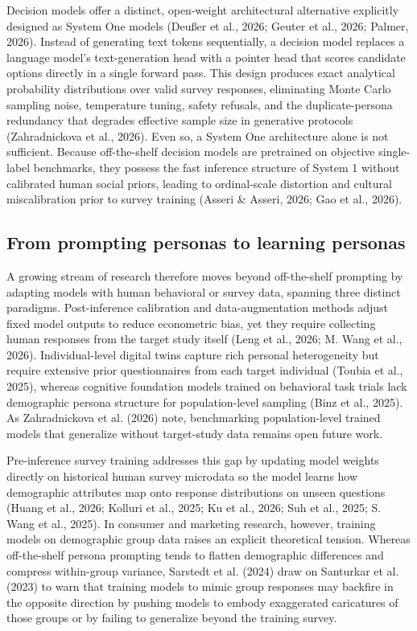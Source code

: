\documentclass[
  11pt,
  letterpaper,
]{article}
\begin{document}
Decision models offer a distinct, open-weight architectural alternative
explicitly designed as System One models (Deußer et al., 2026; Geuter et
al., 2026; Palmer, 2026). Instead of generating text tokens
sequentially, a decision model replaces a language model's
text-generation head with a pointer head that scores candidate options
directly in a single forward pass. This design produces exact analytical
probability distributions over valid survey responses, eliminating Monte
Carlo sampling noise, temperature tuning, safety refusals, and the
duplicate-persona redundancy that degrades effective sample size in
generative protocols (Zahradnickova et al., 2026). Even so, a System One
architecture alone is not sufficient. Because off-the-shelf decision
models are pretrained on objective single-label benchmarks, they possess
the fast inference structure of System 1 without calibrated human social
priors, leading to ordinal-scale distortion and cultural miscalibration
prior to survey training (Asseri \& Asseri, 2026; Gao et al., 2026).

\subsection{From prompting personas to learning
personas}\label{from-prompting-personas-to-learning-personas}

A growing stream of research therefore moves beyond off-the-shelf
prompting by adapting models with human behavioral or survey data,
spanning three distinct paradigms. Post-inference calibration and
data-augmentation methods adjust fixed model outputs to reduce
econometric bias, yet they require collecting human responses from the
target study itself (Leng et al., 2026; M. Wang et al., 2026).
Individual-level digital twins capture rich personal heterogeneity but
require extensive prior questionnaires from each target individual
(Toubia et al., 2025), whereas cognitive foundation models trained on
behavioral task trials lack demographic persona structure for
population-level sampling ({Binz et al.}, 2025). As Zahradnickova et al.
(2026) note, benchmarking population-level trained models that
generalize without target-study data remains open future work.

Pre-inference survey training addresses this gap by updating model
weights directly on historical human survey microdata so the model
learns how demographic attributes map onto response distributions on
unseen questions (Huang et al., 2026; Kolluri et al., 2025; Ku et al.,
2026; Suh et al., 2025; S. Wang et al., 2025). In consumer and marketing
research, however, training models on demographic group data raises an
explicit theoretical tension. Whereas off-the-shelf persona prompting
tends to flatten demographic differences and compress within-group
variance, Sarstedt et al. (2024) draw on Santurkar et al. (2023) to warn
that training models to mimic group responses may backfire in the
opposite direction by pushing models to embody exaggerated caricatures
of those groups or by failing to generalize beyond the training survey.
\end{document}
